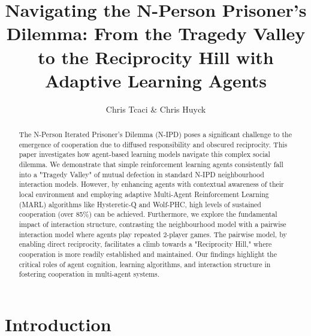 \documentclass[]{llncs} %
\begin{document}
\title{Navigating the N-Person Prisoner's Dilemma: From the Tragedy Valley to the Reciprocity Hill with Adaptive Learning Agents}

\author{Chris Tcaci & Chris Huyck}

\maketitle              

\begin{abstract}
The N-Person Iterated Prisoner's Dilemma (N-IPD) poses a significant challenge to the emergence of cooperation due to diffused responsibility and obscured reciprocity. This paper investigates how agent-based learning models navigate this complex social dilemma. We demonstrate that simple reinforcement learning agents consistently fall into a "Tragedy Valley" of mutual defection in standard N-IPD neighbourhood interaction models. However, by enhancing agents with contextual awareness of their local environment and employing adaptive Multi-Agent Reinforcement Learning (MARL) algorithms like Hysteretic-Q and Wolf-PHC, high levels of sustained cooperation (over 85\%) can be achieved. Furthermore, we explore the fundamental impact of interaction structure, contrasting the neighbourhood model with a pairwise interaction model where agents play repeated 2-player games. The pairwise model, by enabling direct reciprocity, facilitates a climb towards a "Reciprocity Hill," where cooperation is more readily established and maintained. Our findings highlight the critical roles of agent cognition, learning algorithms, and interaction structure in fostering cooperation in multi-agent systems.

\end{abstract}

\section{Introduction}
\label{sec:introduction}
\end{document}
